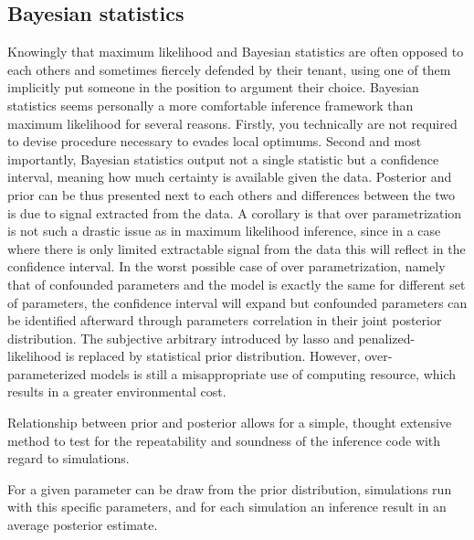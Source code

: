 \subsection{Bayesian statistics}
Knowingly that maximum \gls{likelihood} and Bayesian statistics are often opposed to each others and sometimes fiercely defended by their tenant, using one of them implicitly put someone in the position to argument their choice. 
Bayesian statistics seems personally a more comfortable inference framework than maximum \gls{likelihood} for several reasons. 
Firstly, you technically are not required to devise procedure necessary to evades local optimums.
Second and most importantly, Bayesian statistics output not a single statistic but a confidence interval, meaning how much certainty is available given the data.
Posterior and \gls{prior} can be thus presented next to each others and differences between the two is due to signal extracted from the data.
A corollary is that over parametrization is not such a drastic issue as in maximum \gls{likelihood} inference, since in a case where there is only limited extractable signal from the data this will reflect in the confidence interval.
In the worst possible case of over parametrization, namely that of confounded parameters and the model is exactly the same for different set of parameters, the confidence interval will expand but confounded parameters can be identified afterward through parameters correlation in their joint \gls{posterior} distribution.
The subjective arbitrary introduced by lasso and penalized-likelihood is replaced by statistical \gls{prior} distribution.
However, over-parameterized models is still a misappropriate use of computing resource, which results in a greater environmental cost.

Relationship between \gls{prior} and \gls{posterior} allows for a simple, thought extensive method to test for the repeatability and soundness of the inference code with regard to simulations.

For a given parameter  can be draw from the \gls{prior} distribution, simulations run with this specific parameters, and for each simulation an inference result in an average \gls{posterior} estimate.






